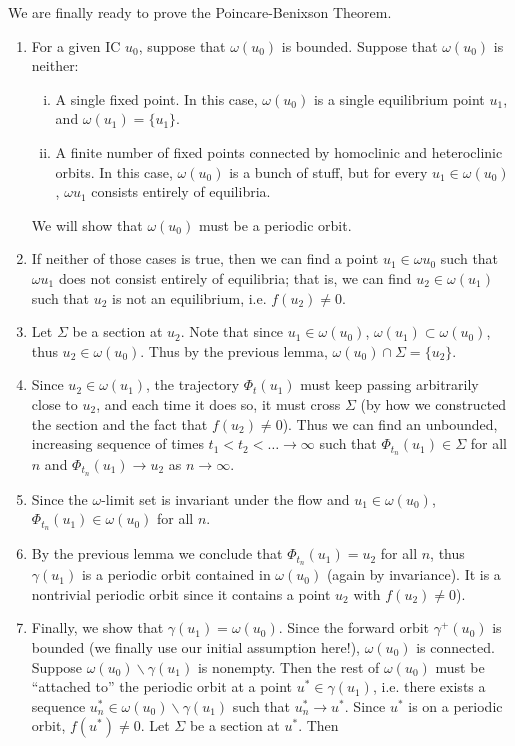 \documentclass{article}
\begin{document}
We are finally ready to prove the Poincare-Benixson Theorem. 

\begin{enumerate}
\item For a given IC $u_0$, suppose that $\omega(u_0)$ is bounded. Suppose that $\omega(u_0)$ is neither:

\begin{enumerate}[(i)]
\item A single fixed point. In this case, $\omega(u_0)$ is a single equilibrium point $u_1$, and $\omega(u_1) = \{ u_1 \}$.
\item A finite number of fixed points connected by homoclinic and heteroclinic orbits. In this case, $\omega(u_0)$ is a bunch of stuff, but for every $u_1 \in \omega(u_0)$, $\omega{u_1}$ consists entirely of equilibria.
\end{enumerate}
We will show that $\omega(u_0)$ must be a periodic orbit.
\item If neither of those cases is true, then we can find a point $u_1 \in \omega{u_0}$ such that $\omega{u_1}$ does not consist entirely of equilibria; that is, we can find $u_2 \in \omega(u_1)$ such that $u_2$ is not an equilibrium, i.e. $f(u_2) \neq 0$.
\item Let $\Sigma$ be a section at $u_2$. Note that since $u_1 \in \omega(u_0)$, $\omega(u_1) \subset \omega(u_0)$, thus $u_2 \in \omega(u_0)$. Thus by the previous lemma, $\omega(u_0) \cap \Sigma = \{ u_2 \}$.
\item Since $u_2 \in \omega(u_1)$, the trajectory $\Phi_t(u_1)$ must keep passing arbitrarily close to $u_2$, and each time it does so, it must cross $\Sigma$ (by how we constructed the section and the fact that $f(u_2) \neq 0$). Thus we can find an unbounded, increasing sequence of times $t_1 < t_2 < \dots \rightarrow \infty$ such that $\Phi_{t_n}(u_1) \in \Sigma$ for all $n$ and $\Phi_{t_n}(u_1) \rightarrow u_2$ as $n \rightarrow \infty$.
\item Since the $\omega$-limit set is invariant under the flow and $u_1 \in \omega(u_0)$, $\Phi_{t_n}(u_1) \in \omega(u_0)$ for all $n$.
\item By the previous lemma we conclude that $\Phi_{t_n}(u_1) = u_2$ for all $n$, thus $\gamma(u_1)$ is a periodic orbit contained in $\omega(u_0)$ (again by invariance). It is a nontrivial periodic orbit since it contains a point $u_2$ with $f(u_2) \neq 0$).

\item Finally, we show that $\gamma(u_1) = \omega(u_0)$. Since the forward orbit $\gamma^+(u_0)$ is bounded (we finally use our initial assumption here!), $\omega(u_0)$ is connected. Suppose $\omega(u_0) \backslash \gamma(u_1)$ is nonempty. Then the rest of $\omega(u_0)$ must be ``attached to'' the periodic orbit at a point $u^* \in \gamma(u_1)$, i.e. there exists a sequence $u_n^* \in \omega(u_0) \backslash \gamma(u_1)$ such that $u_n^* \rightarrow u^*$. Since $u^*$ is on a periodic orbit, $f(u^*) \neq 0$. Let $\Sigma$ be a section at $u^*$. Then 
\end{enumerate}
\end{document}
